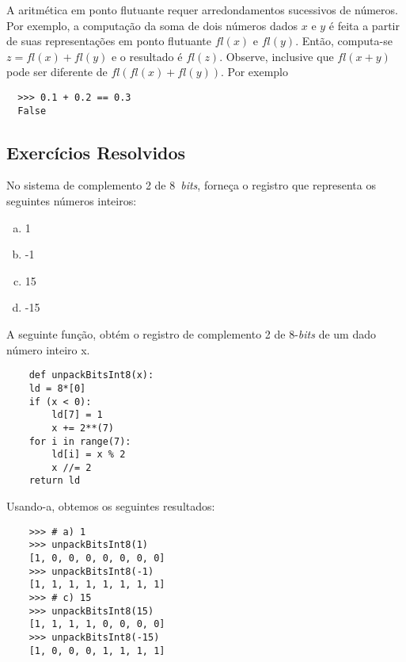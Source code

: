 A aritmética em ponto flutuante requer arredondamentos sucessivos de números. Por exemplo, a computação da soma de dois números dados $x$ e $y$ é feita a partir de suas representações em ponto flutuante $fl(x)$ e $fl(y)$. Então, computa-se $z = fl(x)+fl(y)$ e o resultado é $fl(z)$. Observe, inclusive que $fl(x+y)$ pode ser diferente de $fl(fl(x)+fl(y))$. Por exemplo
\begin{lstlisting}
  >>> 0.1 + 0.2 == 0.3
  False
\end{lstlisting}

\subsection{Exercícios Resolvidos}

\begin{exeresol}
  No sistema de complemento 2 de 8~{\it bits}, forneça o registro que representa os seguintes números inteiros:
  \begin{enumerate}[a)]
  \item 1
  \item -1
  \item 15
  \item -15
  \end{enumerate}
\end{exeresol}
\begin{resol}
  A seguinte função, obtém o registro de complemento 2 de 8-{\it bits} de um dado número inteiro x.
  \begin{lstlisting}
    def unpackBitsInt8(x):
    ld = 8*[0]
    if (x < 0):
        ld[7] = 1
        x += 2**(7)
    for i in range(7):
        ld[i] = x % 2
        x //= 2
    return ld
  \end{lstlisting}
  Usando-a, obtemos os seguintes resultados:
  \begin{lstlisting}
    >>> # a) 1
    >>> unpackBitsInt8(1)
    [1, 0, 0, 0, 0, 0, 0, 0]
    >>> unpackBitsInt8(-1)
    [1, 1, 1, 1, 1, 1, 1, 1]
    >>> # c) 15
    >>> unpackBitsInt8(15)
    [1, 1, 1, 1, 0, 0, 0, 0]
    >>> unpackBitsInt8(-15)
    [1, 0, 0, 0, 1, 1, 1, 1]
  \end{lstlisting}
\end{resol}

